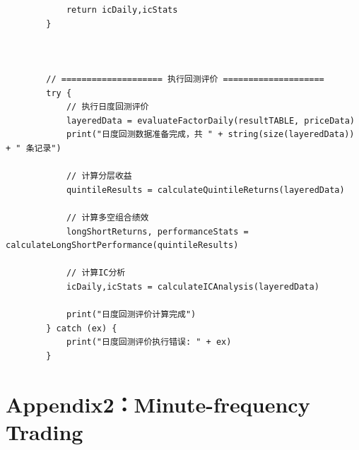 \documentclass[10pt,a4paper]{article}
\begin{document}
\begin{lstlisting}
			return icDaily,icStats
		}
		
		
		
		// ==================== 执行回测评价 ====================
		try {
			// 执行日度回测评价
			layeredData = evaluateFactorDaily(resultTABLE, priceData)
			print("日度回测数据准备完成，共 " + string(size(layeredData)) + " 条记录")
			
			// 计算分层收益
			quintileResults = calculateQuintileReturns(layeredData)
			
			// 计算多空组合绩效
			longShortReturns, performanceStats = calculateLongShortPerformance(quintileResults)
			
			// 计算IC分析
			icDaily,icStats = calculateICAnalysis(layeredData)
			
			print("日度回测评价计算完成")
		} catch (ex) {
			print("日度回测评价执行错误: " + ex)
		}
	\end{lstlisting}
	
	\section*{\centering Appendix2：Minute-frequency Trading}
\end{document}
